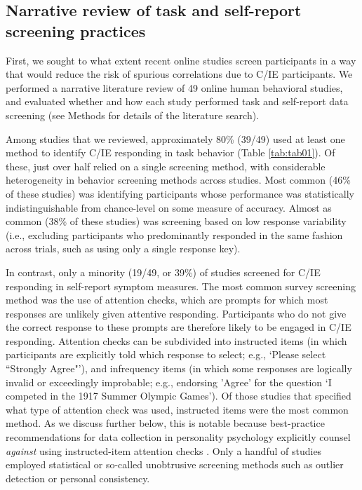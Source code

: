 \documentclass[a4paper,notitlepage,12pt]{article}
\begin{document}
\subsection*{Narrative review of task and self-report screening practices}

First, we sought to what extent recent online studies screen participants in a way that would reduce the risk of spurious correlations due to C/IE participants. We performed a narrative literature review of 49 online human behavioral studies, and evaluated whether and how each study performed task and self-report data screening (see Methods for details of the literature search).

Among studies that we reviewed, approximately 80\% (39/49) used at least one method to identify C/IE responding in task behavior (Table \ref{tab:tab01}). Of these, just over half relied on a single screening method, with considerable heterogeneity in behavior screening methods across studies. Most common (46\% of these studies) was identifying participants whose performance was statistically indistinguishable from chance-level on some measure of accuracy. Almost as common (38\% of these studies) was screening based on low response variability (i.e., excluding participants who predominantly responded in the same fashion across trials, such as using only a single response key).

In contrast, only a minority (19/49, or 39\%) of studies screened for C/IE responding in self-report symptom measures. The most common survey screening method was the use of attention checks, which are prompts for which most responses are unlikely given attentive responding. Participants who do not give the correct response to these prompts are therefore likely to be engaged in C/IE responding. Attention checks can be subdivided into instructed items (in which participants are explicitly told which response to select; e.g., `Please select ``Strongly Agree"'), and infrequency items (in which some responses are logically invalid or exceedingly improbable; e.g., endorsing 'Agree' for the question `I competed in the 1917 Summer Olympic Games'). Of those studies that specified what type of attention check was used, instructed items were the most common method. As we discuss further below, this is notable because best-practice recommendations for data collection in personality psychology explicitly counsel \emph{against} using instructed-item attention checks \cite{barends2019noncompliant, thomas2017validity, hauser2016attentive}. Only a handful of studies employed statistical or so-called unobtrusive screening methods such as outlier detection or personal consistency. 
\end{document}
